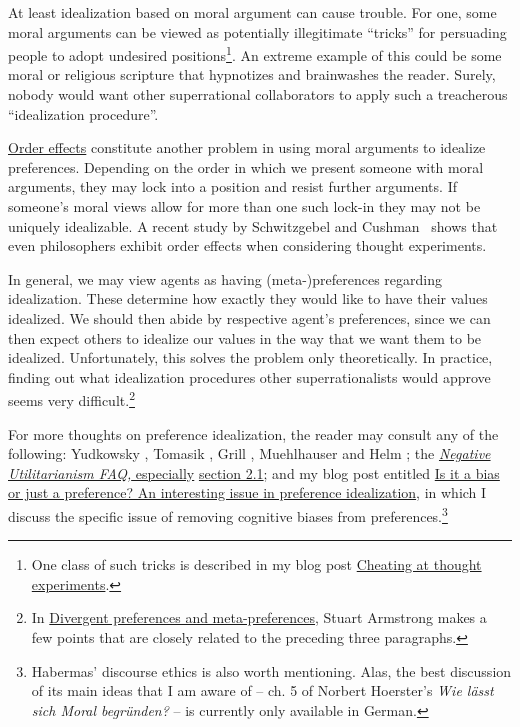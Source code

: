 At least idealization based on moral argument can cause trouble. For
one, some moral arguments can be viewed as potentially illegitimate
``tricks'' for persuading people to adopt undesired positions\footnote{One
  class of such tricks is described in my blog post
  \href{https://casparoesterheld.com/2015/12/06/cheating-at-thought-experiments/}{Cheating
  at thought experiments}.}. An extreme example of this could be some
moral or religious scripture that hypnotizes and brainwashes the reader.
Surely, nobody would want other superrational collaborators to apply
such a treacherous ``idealization procedure''.

\href{http://www.philosophyexperiments.com/sedan/Default5.aspx}{Order
effects} constitute another problem in using moral arguments to
idealize preferences. Depending on the order in which we present someone
with moral arguments, they may lock into a position and resist further
arguments. If someone's moral views allow for more than one such lock-in
they may not be uniquely idealizable. A recent study by
Schwitzgebel and Cushman~\citeyear{Schwitzgebel2012-vh} shows that even philosophers
exhibit order effects when considering thought experiments.

In general, we may view agents as having (meta-)preferences regarding
idealization. These determine how exactly they would like to have their
values idealized. We should then abide by respective agent's
preferences, since we can then expect others to idealize our values in
the way that we want them to be idealized. Unfortunately, this solves
the problem only theoretically. In practice, finding out what
idealization procedures other superrationalists would approve seems very
difficult.\footnote{In
  \href{https://agentfoundations.org/item?id=1492}{Divergent
  preferences and meta-preferences}, Stuart Armstrong makes a few
  points that are closely related to the preceding three paragraphs.}

For more thoughts on preference idealization, the reader may consult any
of the following:
Yudkowsky \citeyear{Yudkowsky2004-fz}, Tomasik \citeyear{Tomasik2016-cb}, Grill
\citeyear{Grill2015-wk}, Muehlhauser and Helm \citeyear{Muehlhauser2012-ib};
the
\href{https://www.utilitarianism.com/nu/nufaq.html}{\emph{Negative
Utilitarianism FAQ,} especially}
\href{https://www.utilitarianism.com/nu/nufaq.html\#2.1}{section
2.1}; and my blog post entitled
\href{https://casparoesterheld.com/2017/01/18/is-it-a-bias-or-just-a-preference-an-interesting-issue-in-preference-idealization/}{Is
it a bias or just a preference? An interesting issue in preference
idealization}, in which I discuss the specific issue of removing
cognitive biases from preferences.\footnote{Habermas' discourse ethics
  is also worth mentioning. Alas, the best discussion of its main ideas
  that I am aware of -- ch. 5 of Norbert Hoerster's \emph{Wie lässt sich
  Moral begründen?} -- is currently only available in German.}

